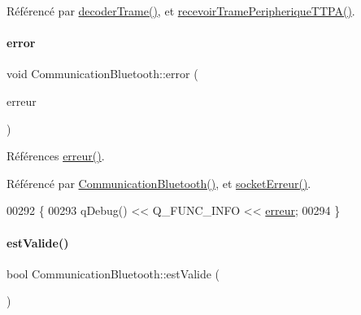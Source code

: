 Référencé par \hyperlink{class_communication_bluetooth_a6b53f12131d9323cec8f2a03fe716e6a}{decoder\+Trame()}, et \hyperlink{class_communication_bluetooth_ae50bbbf70a5afdea0a0c4d3322e90e40}{recevoir\+Trame\+Peripherique\+T\+T\+P\+A()}.

\mbox{\label{class_communication_bluetooth_a6e0d7054012e11af9d55d6d4f5764259}} 
\paragraph{\texorpdfstring{error}{error}}
{\footnotesize\ttfamily void Communication\+Bluetooth\+::error (\begin{DoxyParamCaption}\item[{Q\+Bluetooth\+Local\+Device\+::\+Error}]{erreur }\end{DoxyParamCaption})\hspace{0.3cm}{\ttfamily [slot]}}



Références \hyperlink{class_communication_bluetooth_a90c5c3c42145bad0f80a7a75d98dc253}{erreur()}.



Référencé par \hyperlink{class_communication_bluetooth_aa759c75b0df7f7e237eec495f156bba0}{Communication\+Bluetooth()}, et \hyperlink{class_communication_bluetooth_a41a4f8ab7deffd296d04018db20314a1}{socket\+Erreur()}.


\begin{DoxyCode}
00292 \{
00293     qDebug() << Q\_FUNC\_INFO << \hyperlink{class_communication_bluetooth_a90c5c3c42145bad0f80a7a75d98dc253}{erreur};
00294 \}
\end{DoxyCode}
\mbox{\label{class_communication_bluetooth_a69f544bb71f5287689ee051511811669}} 
\paragraph{\texorpdfstring{est\+Valide()}{estValide()}}
{\footnotesize\ttfamily bool Communication\+Bluetooth\+::est\+Valide (\begin{DoxyParamCaption}{ }\end{DoxyParamCaption})}

